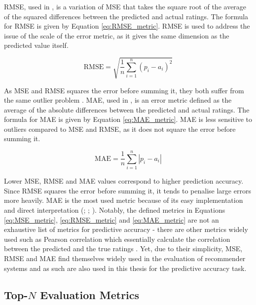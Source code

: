 RMSE, used in \cite{bennett2007netflix}, is a variation of MSE that takes the square root of the average of the squared differences between the predicted and actual ratings. The formula for RMSE is given by Equation \ref{eq:RMSE_metric}. RMSE is used to address the issue of the scale of the error metric, as it gives the same dimension as the predicted value itself. 

\begin{equation}
    \mathrm{RMSE}=\sqrt{\frac{1}{n} \sum_{i=1}^n\left(p_i-a_i\right)^2}
    \label{eq:RMSE_metric}
\end{equation}

As MSE and RMSE squares the error before summing it, they both suffer from the same outlier problem \cite{steck2013evaluation}. MAE, used in \cite{herlocker2004evaluating}, is an error metric defined as the average of the absolute differences between the predicted and actual ratings. The formula for MAE is given by Equation \ref{eq:MAE_metric}. MAE is less sensitive to outliers compared to MSE and RMSE, as it does not square the error before summing it. 

\begin{equation}
    \mathrm{MAE}=\frac{1}{n} \sum_{i=1}^n\left|p_i-a_i\right|
    \label{eq:MAE_metric}
\end{equation}

Lower MSE, RMSE and MAE values correspond to higher prediction accuracy. Since RMSE squares the error before summing it, it tends to penalise large errors more heavily. MAE is the most used metric because of its easy implementation and direct interpretation (\cite{herlocker2004evaluating}; \cite{sarwar2000analysis}; \cite{herlocker1999algorithmic}). Notably, the defined metrics in Equations \ref{eq:MSE_metric}, \ref{eq:RMSE_metric} and \ref{eq:MAE_metric} are not an exhaustive list of metrics for predictive accuracy - there are other metrics widely used such as Pearson correlation which essentially calculate the correlation between the predicted and the true ratings \cite{steck2013evaluation}. Yet, due to their simplicity, MSE, RMSE and MAE find themselves widely used in the evaluation of recommender systems and as such are also used in this thesis for the predictive accuracy task.

\subsection{Top-$N$ Evaluation Metrics}
\label{subsubsec:4 Top-N Evaluation}

